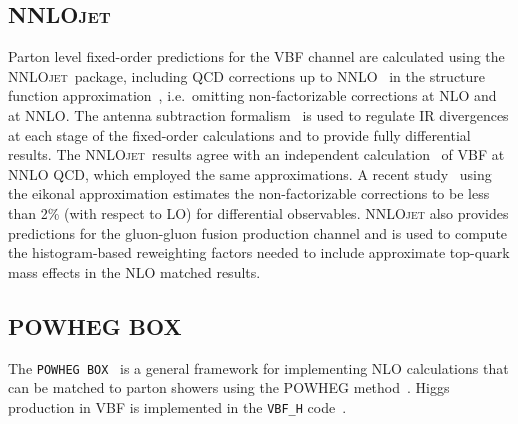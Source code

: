 \documentclass[10pt,prd,fleqn,superscriptaddress,notitlepage,nofootinbib,preprintnumbers,nobalancelastpage]{revtex4-1}
\newcommand{\NNLOJET}{\textsc{NNLOjet}\xspace}
\newcommand{\PWG}{\texttt{POWHEG BOX}\xspace}
\newcommand{\VBF}{VBF\xspace}
\begin{document}
\subsection{\NNLOJET}
\label{sec:setup_nnlojet}
Parton level fixed-order predictions for the \VBF channel are calculated using the \protect\NNLOJET\ package, including QCD corrections up to NNLO~\cite{Cruz-Martinez:2018rod} in the structure function approximation~\cite{Han:1992hr}, i.e.\ omitting non-factorizable corrections at NLO and at NNLO. 
The antenna subtraction formalism~\cite{GehrmannDeRidder:2005cm,GehrmannDeRidder:2005aw,Daleo:2006xa,Daleo:2009yj,GehrmannDeRidder:2012ja,Currie:2013vh} is used to regulate IR divergences at each stage of the fixed-order calculations and to provide fully differential results.
The \NNLOJET\ results agree with an independent calculation~\cite{Cacciari:2015jma} of \VBF at NNLO QCD, which employed the same approximations. A recent study~\cite{Liu:2019tuy} using the eikonal approximation estimates the non-factorizable corrections to be less than 2\% (with respect to LO) for differential observables.
\protect\NNLOJET also provides predictions for the gluon-gluon fusion production channel and is used to compute the histogram-based reweighting factors needed to include approximate top-quark mass effects in the NLO matched results.


\subsection{POWHEG BOX}
The \PWG{}~\cite{Frixione:2007vw,Alioli:2010xd} is a general framework for implementing NLO calculations that can be matched to parton showers using the POWHEG method~\cite{Nason:2004rx}.
Higgs production in \VBF is implemented in the {\tt VBF\_H} code~\cite{Nason:2009ai}.
\end{document}
